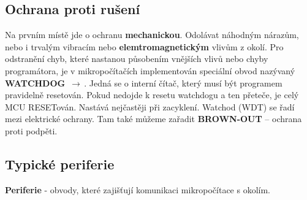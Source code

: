 \subsection{Ochrana proti rušení}
Na prvním místě jde o ochranu \textbf{mechanickou}. Odolávat náhodným nárazům, nebo i trvalým vibracím nebo \textbf{elemtromagnetickým} vlivům z okolí. Pro odstranění chyb, které nastanou působením vnějších vlivů nebo chyby programátora, je v mikropočítačích implementován speciální obvod nazývaný \textbf{WATCHDOG} $\,\to\,$. Jedná se o interní čítač, který musí být programem pravidelně resetován. Pokud nedojde k resetu watchdogu a ten přeteče, je celý MCU RESETován. Nastává nejčastěji při zacyklení. Watchod (WDT) se řadí mezi elektrické ochrany. Tam také můžeme zařadit \textbf{BROWN-OUT} -- ochrana proti podpěti.

\subsection{Typické periferie}
\textbf{Periferie} - obvody, které zajišťují komunikaci mikropočítace s okolím.

